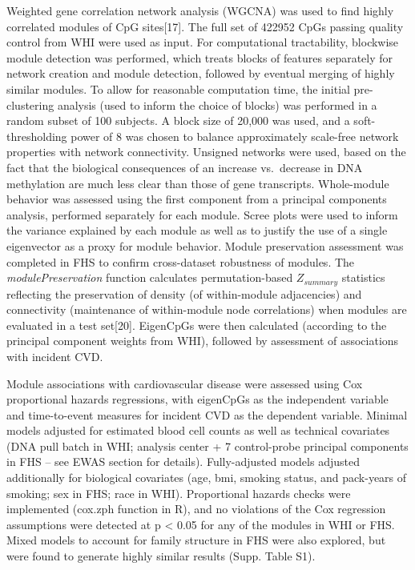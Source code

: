 \documentclass[]{article}
\theoremstyle{definition}
\theoremstyle{definition}
\theoremstyle{definition}
\theoremstyle{remark}
\begin{document}
Weighted gene correlation network analysis (WGCNA) was used to find
highly correlated modules of CpG sites{[}17{]}. The full set of 422952
CpGs passing quality control from WHI were used as input. For
computational tractability, blockwise module detection was performed,
which treats blocks of features separately for network creation and
module detection, followed by eventual merging of highly similar
modules. To allow for reasonable computation time, the initial
pre-clustering analysis (used to inform the choice of blocks) was
performed in a random subset of 100 subjects. A block size of 20,000 was
used, and a soft-thresholding power of 8 was chosen to balance
approximately scale-free network properties with network connectivity.
Unsigned networks were used, based on the fact that the biological
consequences of an increase vs.~decrease in DNA methylation are much
less clear than those of gene transcripts. Whole-module behavior was
assessed using the first component from a principal components analysis,
performed separately for each module. Scree plots were used to inform
the variance explained by each module as well as to justify the use of a
single eigenvector as a proxy for module behavior. Module preservation
assessment was completed in FHS to confirm cross-dataset robustness of
modules. The \emph{modulePreservation} function calculates
permutation-based \(Z_{summary}\) statistics reflecting the preservation
of density (of within-module adjacencies) and connectivity (maintenance
of within-module node correlations) when modules are evaluated in a test
set{[}20{]}. EigenCpGs were then calculated (according to the principal
component weights from WHI), followed by assessment of associations with
incident CVD.

Module associations with cardiovascular disease were assessed using Cox
proportional hazards regressions, with eigenCpGs as the independent
variable and time-to-event measures for incident CVD as the dependent
variable. Minimal models adjusted for estimated blood cell counts as
well as technical covariates (DNA pull batch in WHI; analysis center + 7
control-probe principal components in FHS -- see EWAS section for
details). Fully-adjusted models adjusted additionally for biological
covariates (age, bmi, smoking status, and pack-years of smoking; sex in
FHS; race in WHI). Proportional hazards checks were implemented (cox.zph
function in R), and no violations of the Cox regression assumptions were
detected at p \textless{} 0.05 for any of the modules in WHI or FHS.
Mixed models to account for family structure in FHS were also explored,
but were found to generate highly similar results (Supp. Table S1).
\end{document}
